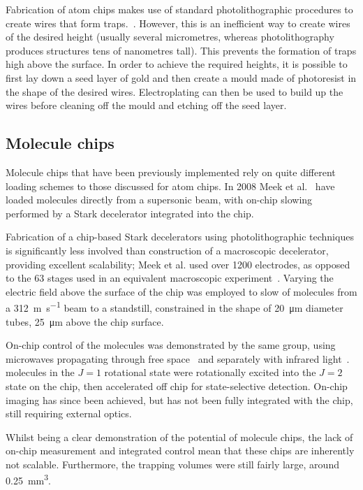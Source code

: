 %
Fabrication of atom chips makes use of standard photolithographic procedures to
create wires that form traps.~\cite{2011Ac}. However, this is an inefficient way
to create wires of the desired height (usually several micrometres, whereas
photolithography produces structures tens of nanometres tall). This prevents the
formation of traps high above the surface. In order to achieve the required
heights, it is possible to first lay down a seed layer of gold and then create a
mould made of photoresist in the shape of the desired wires. Electroplating can
then be used to build up the wires before cleaning off the mould and etching off
the seed layer.~\cite{4797887}

\subsection{Molecule chips}
\label{litrev:molculechips}


Molecule chips that have been previously implemented rely on quite different
loading schemes to those discussed for atom chips. In 2008 Meek et
al.~\cite{Meek2008} have loaded \CO{} molecules directly from a supersonic
beam, with on-chip slowing performed by a Stark decelerator integrated into the
chip.

Fabrication of a chip-based Stark decelerators using photolithographic
techniques is significantly less involved than construction of a macroscopic
decelerator, providing excellent scalability; Meek et al. used over 1200
electrodes, as opposed to the 63 stages used in an equivalent macroscopic
experiment~\cite{Bethlem1999}. Varying the electric field above the surface of
the chip was employed to slow of molecules from a \SI{312}{\metre\per\second}
beam to a standstill, constrained in the shape of \SI{20}{\micro\metre} diameter
tubes, \SI{25}{\micro\metre} above the chip surface.~\cite{Meek2009}

On-chip control of the molecules was demonstrated by the same group, using
microwaves propagating through free space~\cite{doi:10.1002/cphc.201001007} and
separately with infrared light~\cite{doi:10.1080/00268976.2012.683885}.  \CO{}
molecules in the $J=1$ rotational state were rotationally excited into the $J=2$
state on the chip, then accelerated off chip for state-selective detection.
On-chip imaging has since been achieved, but has not been fully integrated with
the chip, still requiring external optics.~\cite{Marx2013}

Whilst being a clear demonstration of the potential of
molecule chips, the lack of on-chip measurement and integrated control mean that
these chips are inherently not scalable.  Furthermore, the trapping volumes were
still fairly large, around \SI{0.25}{\milli\metre\cubed}. 

